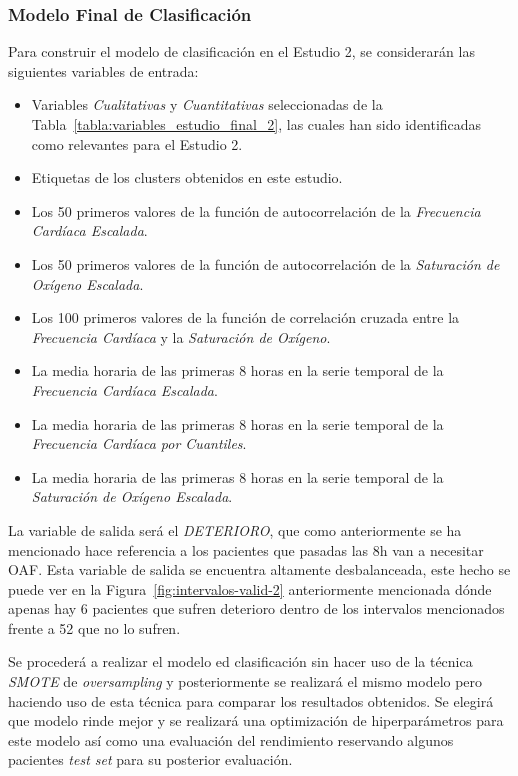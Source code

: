 \subsubsection{Modelo Final de Clasificación}

Para construir el modelo de clasificación en el Estudio 2, se considerarán las siguientes variables de entrada:

\begin{itemize}
    \item Variables \textit{Cualitativas} y \textit{Cuantitativas} seleccionadas de la Tabla~\ref{tabla:variables_estudio_final_2}, las cuales han sido identificadas como relevantes para el Estudio 2.
    \item Etiquetas de los clusters obtenidos en este estudio.
    \item Los 50 primeros valores de la función de autocorrelación de la \textit{Frecuencia Cardíaca Escalada}.
    \item Los 50 primeros valores de la función de autocorrelación de la \textit{Saturación de Oxígeno Escalada}.
    \item Los 100 primeros valores de la función de correlación cruzada entre la \textit{Frecuencia Cardíaca} y la \textit{Saturación de Oxígeno}.
    \item La media horaria de las primeras 8 horas en la serie temporal de la \textit{Frecuencia Cardíaca Escalada}.
    \item La media horaria de las primeras 8 horas en la serie temporal de la \textit{Frecuencia Cardíaca por Cuantiles}.
    \item La media horaria de las primeras 8 horas en la serie temporal de la \textit{Saturación de Oxígeno Escalada}.
\end{itemize}

La variable de salida será el \textit{DETERIORO}, que como anteriormente se ha mencionado hace referencia a los pacientes que  pasadas las 8h van a necesitar OAF. Esta variable de salida se encuentra altamente desbalanceada, este hecho se puede ver en la Figura~\ref{fig:intervalos-valid-2} anteriormente mencionada dónde apenas hay 6 pacientes que sufren deterioro dentro de los intervalos mencionados frente a 52 que no lo sufren.

Se procederá a realizar el modelo ed clasificación sin hacer uso de la técnica \textit{SMOTE} de \textit{oversampling} y posteriormente se realizará el mismo modelo pero haciendo uso de esta técnica para comparar los resultados obtenidos. Se elegirá que modelo rinde mejor y se realizará una optimización de hiperparámetros para este modelo así como una evaluación del rendimiento reservando algunos pacientes \textit{test set} para su posterior evaluación.

